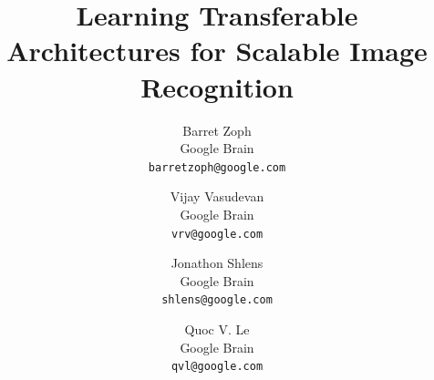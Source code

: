 \documentclass[10pt,twocolumn,letterpaper]{article}
\begin{document}
\title{Learning Transferable Architectures for Scalable Image Recognition}

\author{Barret Zoph\\
Google Brain\\
{\tt\small barretzoph@google.com}
\and
Vijay Vasudevan\\
Google Brain\\
{\tt\small vrv@google.com}
\and
Jonathon Shlens\\
Google Brain\\
{\tt\small shlens@google.com}
\and
Quoc V. Le\\
Google Brain\\
{\tt\small qvl@google.com}
}

\maketitle












{\small


}

\clearpage

\end{document}
